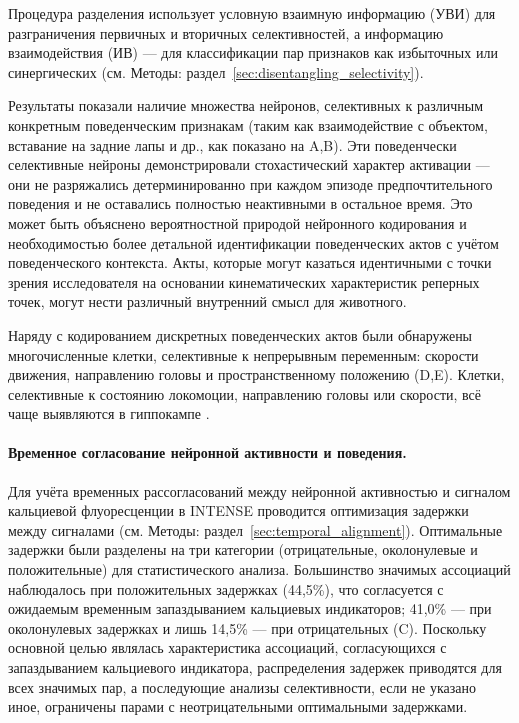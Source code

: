 Процедура разделения использует условную взаимную информацию (УВИ) для
разграничения первичных и вторичных селективностей, а информацию взаимодействия (ИВ) --- для
классификации пар признаков как избыточных или синергических (см. Методы:
раздел~\ref{sec:disentangling_selectivity}).

Результаты показали наличие множества нейронов, селективных к различным
конкретным поведенческим признакам (таким как взаимодействие с объектом, вставание на задние лапы и др.,
как показано на A,B).
Эти поведенчески селективные нейроны демонстрировали
стохастический характер активации --- они не разряжались детерминированно при
каждом эпизоде предпочтительного поведения и не оставались полностью неактивными в остальное время.
Это может быть объяснено вероятностной природой нейронного кодирования и необходимостью
более детальной идентификации поведенческих актов с учётом поведенческого контекста.
Акты, которые могут казаться идентичными с точки зрения исследователя на основании
кинематических характеристик реперных точек, могут нести различный внутренний
смысл для животного.

Наряду с кодированием дискретных поведенческих актов были обнаружены многочисленные клетки, селективные к
непрерывным переменным: скорости движения, направлению головы и пространственному положению
(D,E). Клетки, селективные к состоянию локомоции, направлению головы или скорости, всё чаще выявляются в
гиппокампе \cite{kropff2015speed,Gois2018,Acharya2016}.

\paragraph{Временное согласование нейронной активности и поведения.}
\label{sec:temporal_results}
Для учёта временных рассогласований между нейронной активностью и сигналом кальциевой
флуоресценции в INTENSE проводится оптимизация задержки между сигналами (см. Методы:
раздел~\ref{sec:temporal_alignment}).
Оптимальные задержки были разделены на три категории (отрицательные, околонулевые
и положительные) для статистического анализа. Большинство значимых ассоциаций
наблюдалось при положительных задержках (44,5\%), что согласуется с ожидаемым временным запаздыванием
кальциевых индикаторов; 41,0\% --- при околонулевых задержках и лишь 14,5\% --- при отрицательных
(C). Поскольку основной целью являлась характеристика ассоциаций, согласующихся с запаздыванием кальциевого индикатора, распределения задержек приводятся для всех значимых пар, а последующие анализы селективности, если не указано иное, ограничены парами с неотрицательными оптимальными задержками.

